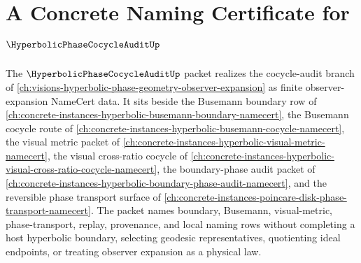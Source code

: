 \chapter{A Concrete Naming Certificate for $\HyperbolicPhaseCocycleAuditUp$}
\label{ch:concrete-instances-hyperbolic-phase-cocycle-audit-namecert}

The $\HyperbolicPhaseCocycleAuditUp$ packet realizes the cocycle-audit branch of \autoref{ch:visions-hyperbolic-phase-geometry-observer-expansion} as finite observer-expansion NameCert data. It sits beside the Busemann boundary row of \autoref{ch:concrete-instances-hyperbolic-busemann-boundary-namecert}, the Busemann cocycle route of \autoref{ch:concrete-instances-hyperbolic-busemann-cocycle-namecert}, the visual metric packet of \autoref{ch:concrete-instances-hyperbolic-visual-metric-namecert}, the visual cross-ratio cocycle of \autoref{ch:concrete-instances-hyperbolic-visual-cross-ratio-cocycle-namecert}, the boundary-phase audit packet of \autoref{ch:concrete-instances-hyperbolic-boundary-phase-audit-namecert}, and the reversible phase transport surface of \autoref{ch:concrete-instances-poincare-disk-phase-transport-namecert}. The packet names boundary, Busemann, visual-metric, phase-transport, replay, provenance, and local naming rows without completing a host hyperbolic boundary, selecting geodesic representatives, quotienting ideal endpoints, or treating observer expansion as a physical law.

